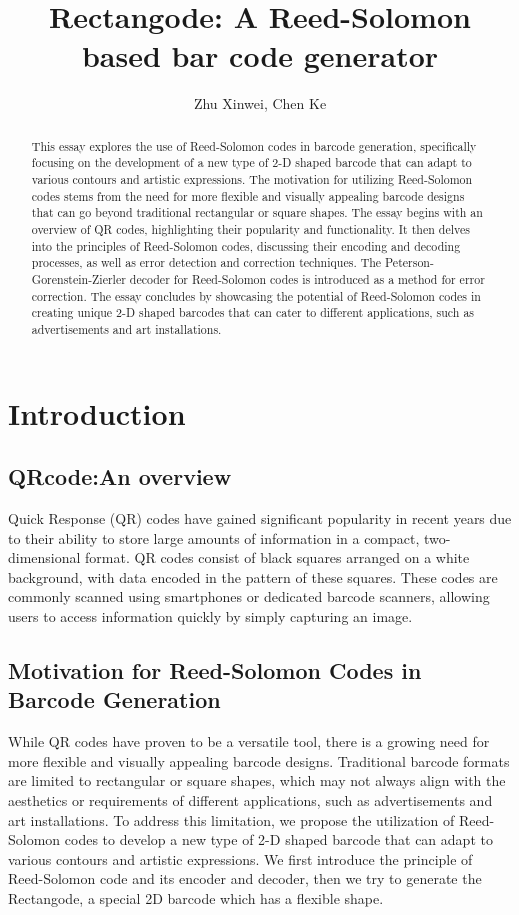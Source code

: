 \documentclass[12pt]{article}
\title{Rectangode: A Reed-Solomon based bar code generator}
\author{Zhu Xinwei, Chen Ke}
\begin{document}
\maketitle

\begin{abstract}
    This essay explores the use of Reed-Solomon codes in barcode generation, specifically focusing on the development of a new type of 2-D shaped barcode that can adapt to various contours and artistic expressions. The motivation for utilizing Reed-Solomon codes stems from the need for more flexible and visually appealing barcode designs that can go beyond traditional rectangular or square shapes. The essay begins with an overview of QR codes, highlighting their popularity and functionality. It then delves into the principles of Reed-Solomon codes, discussing their encoding and decoding processes, as well as error detection and correction techniques. The Peterson-Gorenstein-Zierler decoder for Reed-Solomon codes is introduced as a method for error correction. The essay concludes by showcasing the potential of Reed-Solomon codes in creating unique 2-D shaped barcodes that can cater to different applications, such as advertisements and art installations.
\end{abstract}
\newpage
\tableofcontents
\newpage
\section{Introduction}
\subsection{QRcode:An overview}
Quick Response (QR) codes have gained significant popularity in recent years due to their ability to store large amounts of information in a compact, two-dimensional format. QR codes consist of black squares arranged on a white background, with data encoded in the pattern of these squares. These codes are commonly scanned using smartphones or dedicated barcode scanners, allowing users to access information quickly by simply capturing an image.
\subsection{Motivation for Reed-Solomon Codes in Barcode Generation}
While QR codes have proven to be a versatile tool, there is a growing need for more flexible and visually appealing barcode designs. Traditional barcode formats are limited to rectangular or square shapes, which may not always align with the aesthetics or requirements of different applications, such as advertisements and art installations. To address this limitation, we propose the utilization of Reed-Solomon codes to develop a new type of 2-D shaped barcode that can adapt to various contours and artistic expressions. We first introduce the principle of Reed-Solomon code and its encoder and decoder, then we try to generate the Rectangode, a special 2D barcode which has a flexible shape.
\end{document}
